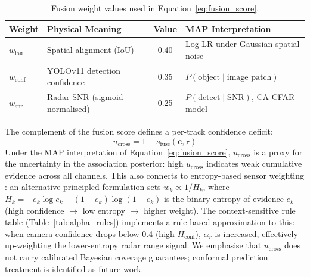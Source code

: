 \documentclass[drones,article,submit,pdftex]{Definitions/mdpi}
\begin{document}
\begin{table}[ht]
  \centering
  \caption{Fusion weight values used in Equation~\eqref{eq:fusion_score}.}
  \label{tab:weights}
  \begin{tabular}{llcl}
    \toprule
    Weight & Physical Meaning & Value & MAP Interpretation \\
    \midrule
    $w_\text{iou}$  & Spatial alignment (IoU)        & 0.40 & Log-LR under Gaussian spatial noise \\
    $w_\text{conf}$ & YOLOv11 detection confidence   & 0.35 & $P(\text{object}\mid\text{image patch})$ \\
    $w_\text{snr}$  & Radar SNR (sigmoid-normalised)  & 0.25 & $P(\text{detect}\mid\text{SNR})$, CA-CFAR model \\
    \bottomrule
  \end{tabular}
\end{table}

The complement of the fusion score defines a per-track confidence deficit:
\begin{equation}
  u_\text{cross} = 1 - s_\text{fuse}(\mathbf{c}, \mathbf{r})
  \label{eq:uncertainty}
\end{equation}
Under the MAP interpretation of Equation~\eqref{eq:fusion_score},
$u_\text{cross}$ is a proxy for the uncertainty in the association posterior:
high $u_\text{cross}$ indicates weak cumulative evidence across all channels.
This also connects to entropy-based sensor weighting
\cite{ref_dempster_shafer}: an alternative principled formulation sets
$w_k \propto 1/H_k$, where $H_k = -e_k \log e_k - (1-e_k)\log(1-e_k)$ is the
binary entropy of evidence $e_k$ (high confidence $\to$ low entropy $\to$
higher weight).
The context-sensitive rule table (Table~\ref{tab:alpha_rules}) implements a
rule-based approximation to this: when camera confidence drops below 0.4
(high $H_\text{conf}$), $\alpha_r$ is increased, effectively up-weighting the
lower-entropy radar range signal.
We emphasise that $u_\text{cross}$ does not carry calibrated Bayesian coverage
guarantees; conformal prediction treatment is identified as future work.
\end{document}
